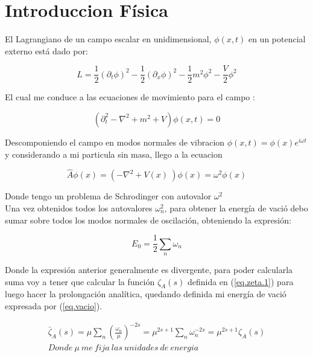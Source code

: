 \chapter{Introduccion Física}

El Lagrangiano de un campo escalar en unidimensional, $\phi (x,t)$ en un potencial externo está dado por:

\begin{equation}
    L = \frac{1}{2} (\partial _t \phi  ) ^2
    - \frac{1}{2} (\partial _x \phi ) ^2 - 
    \frac{1}{2} m ^2 \phi ^2  - \frac{V}{2} \phi ^2 
\end{equation}

El cual me conduce a las ecuaciones de movimiento para el campo : 


\begin{equation}
    ( \partial _t ^2 - \nabla ^2 + m ^2 +V  ) 
    \phi (x,t) = 0
\end{equation}

Descomponiendo el campo en modos normales de vibracion  $\phi (x,t) = \phi(x) e ^{i \omega t}$ y considerando a mi particula sin masa, llego a la ecuacion

\begin{equation}
\hat{A} \phi(x) = ( - \nabla ^2 + V(x) \ ) \phi (x) = \omega ^2 \phi (x)  
\end{equation}


Donde tengo un problema de Schrodinger con autovalor $\omega  ^2$ \\


Una vez obtenidos todos los autovalores $\omega ^2 _n $, para obtener la energía de vació debo sumar sobre todos los modos normales de oscilación, obteniendo la expresión: 

\begin{equation}
    E _0 = 
    \frac{1}{2}  \sum _n \omega _n 
\label{eq.vacio}
\end{equation}

Donde la expresión anterior generalmente es divergente, para poder calcularla suma voy a tener que calcular la función $\zeta _A (s) $ definida en (\ref{eq.zeta.1}) para luego hacer la prolongación analítica, quedando definida mi energía de vació expresada por (\ref{eq.vacio}).  


\begin{equation}
\begin{array}{c}
    \bar{\zeta}  _A (s) = \mu  \sum _n  ( \frac{\omega _n}{\mu}  ) ^{-2 s} =
    \mu ^{2s+1} \sum _n   \omega _n   ^{-2 s}  =  \mu ^{2s+1} \zeta _A (s) \\
    Donde \ \mu \ me \ fija \ las \ unidades \ de \ energia 
\end{array}
\label{eq.zeta.1}
\end{equation}

